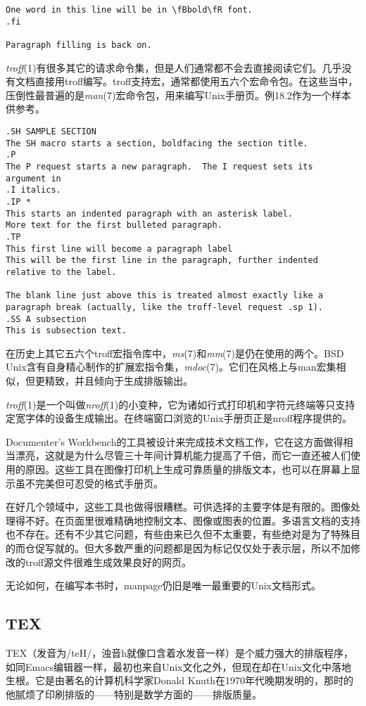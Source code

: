 \documentclass[12pt,oneside]{ctexbook}
\begin{document}
\begin{common-format}
\begin{Verbatim}[label=例18.1  groff(1)标记实例]
One word in this line will be in \fBbold\fR font.
.fi

Paragraph filling is back on.
\end{Verbatim}


\textit{troff}(1)有很多其它的请求命令集，但是人们通常都不会去直接阅读它们。几乎没有文档直接用troff编写。troff支持宏，通常都使用五六个宏命令包。在这些当中，压倒性最普遍的是\textit{man}(7)宏命令包，用来编写Unix手册页。例18.2作为一个样本供参考。
\begin{Verbatim}[label=例18.2 man标记实例]
.SH SAMPLE SECTION
The SH macro starts a section, boldfacing the section title.
.P
The P request starts a new paragraph.  The I request sets its
argument in
.I italics.
.IP *
This starts an indented paragraph with an asterisk label.
More text for the first bulleted paragraph.
.TP
This first line will become a paragraph label
This will be the first line in the paragraph, further indented
relative to the label.

The blank line just above this is treated almost exactly like a
paragraph break (actually, like the troff-level request .sp 1).
.SS A subsection
This is subsection text.
\end{Verbatim}

在历史上其它五六个troff宏指令库中，\textit{ms}(7)和\textit{mm}(7)是仍在使用的两个。BSD Unix含有自身精心制作的扩展宏指令集，\textit{mdoc}(7)。它们在风格上与man宏集相似，但更精致，并且倾向于生成排版输出。

\textit{troff}(1)是一个叫做\textit{nroff}(1)的小变种，它为诸如行式打印机和字符元终端等只支持定宽字体的设备生成输出。在终端窗口浏览的Unix手册页正是nroff程序提供的。

Documenter's Workbench的工具被设计来完成技术文档工作，它在这方面做得相当漂亮，这就是为什么尽管三十年间计算机能力提高了千倍，而它一直还被人们使用的原因。这些工具在图像打印机上生成可靠质量的排版文本，也可以在屏幕上显示虽不完美但可忍受的格式手册页。

在好几个领域中，这些工具也做得很糟糕。可供选择的主要字体是有限的。图像处理得不好。在页面里很难精确地控制文本、图像或图表的位置。多语言文档的支持也不存在。还有不少其它问题，有些由来已久但不太重要，有些绝对是为了特殊目的而仓促写就的。但大多数严重的问题都是因为标记仅仅处于表示层，所以不加修改的troff源文件很难生成效果良好的网页。

无论如何，在编写本书时，manpage仍旧是唯一最重要的Unix文档形式。

\subsection{TEX}
TEX（发音为/teH/，浊音h就像口含着水发音一样）是个威力强大的排版程序，如同Emacs编辑器一样，最初也来自Unix文化之外，但现在却在Unix文化中落地生根。它是由著名的计算机科学家Donald Knuth在1970年代晚期发明的，那时的他腻烦了印刷排版的——特别是数学方面的——排版质量。


\end{common-format}
\end{document}
